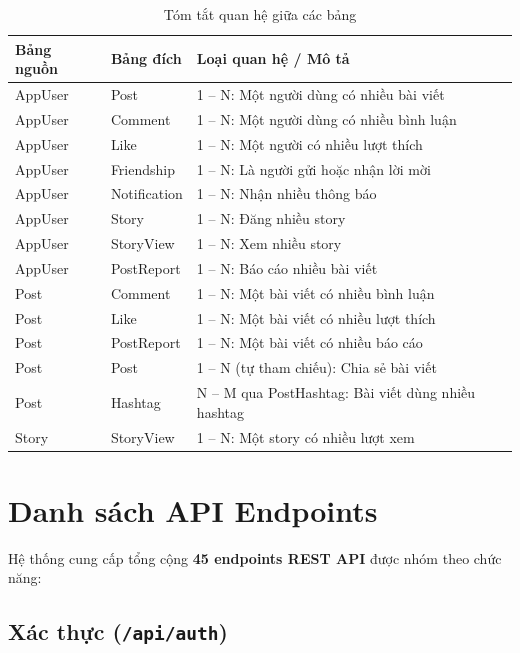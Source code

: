 \documentclass[a4paper]{article}
\begin{document}
\begin{table}[h!]
\centering
\caption{Tóm tắt quan hệ giữa các bảng}
\begin{tabularx}{\textwidth}{|l|l|X|}
\hline
\textbf{Bảng nguồn} & \textbf{Bảng đích} & \textbf{Loại quan hệ / Mô tả} \\
\hline
AppUser & Post & 1 -- N: Một người dùng có nhiều bài viết \\
\hline
AppUser & Comment & 1 -- N: Một người dùng có nhiều bình luận \\
\hline
AppUser & Like & 1 -- N: Một người có nhiều lượt thích \\
\hline
AppUser & Friendship & 1 -- N: Là người gửi hoặc nhận lời mời \\
\hline
AppUser & Notification & 1 -- N: Nhận nhiều thông báo \\
\hline
AppUser & Story & 1 -- N: Đăng nhiều story \\
\hline
AppUser & StoryView & 1 -- N: Xem nhiều story \\
\hline
AppUser & PostReport & 1 -- N: Báo cáo nhiều bài viết \\
\hline
Post & Comment & 1 -- N: Một bài viết có nhiều bình luận \\
\hline
Post & Like & 1 -- N: Một bài viết có nhiều lượt thích \\
\hline
Post & PostReport & 1 -- N: Một bài viết có nhiều báo cáo \\
\hline
Post & Post & 1 -- N (tự tham chiếu): Chia sẻ bài viết \\
\hline
Post & Hashtag & N -- M qua PostHashtag: Bài viết dùng nhiều hashtag \\
\hline
Story & StoryView & 1 -- N: Một story có nhiều lượt xem \\
\hline
\end{tabularx}
\end{table}

\newpage

\section{Danh sách API Endpoints}

Hệ thống cung cấp tổng cộng \textbf{45 endpoints REST API} được nhóm theo chức năng:

\subsection{Xác thực (\texttt{/api/auth})}
\end{document}
